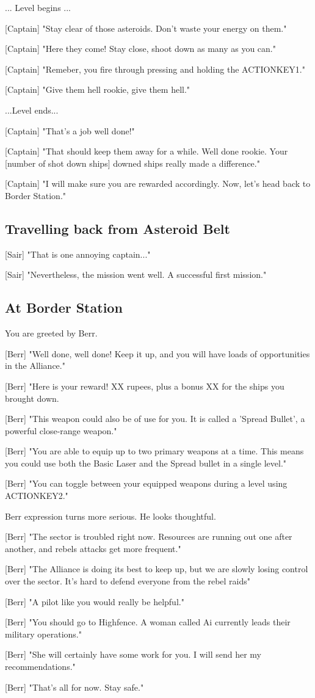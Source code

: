 \documentclass[a4paper,12pt]{article}
\begin{document}
... Level begins ...

[Captain] "Stay clear of those asteroids. Don't waste your energy on them."

[Captain] "Here they come! Stay close, shoot down as many as you can." 

[Captain] "Remeber, you fire through pressing and holding the ACTIONKEY1." 

[Captain] "Give them hell rookie, give them hell."

...Level ends...

[Captain] "That's a job well done!" 

[Captain] "That should keep them away for a while. Well done rookie. Your [number of shot down ships] downed ships really made a difference."

[Captain] "I will make sure you are rewarded accordingly. Now, let's head back to Border Station."

\subsection{Travelling back from Asteroid Belt}

[Sair] "That is one annoying captain..." 

[Sair] "Nevertheless, the mission went well. A successful first mission."

\subsection{At Border Station}

You are greeted by Berr. 

[Berr] "Well done, well done! Keep it up, and you will have loads of opportunities
in the Alliance." 

[Berr] "Here is your reward! XX rupees, plus a bonus XX for the ships you brought down. 

[Berr] "This weapon could also be of use for you. It is called a 'Spread Bullet', a powerful close-range weapon."

[Berr] "You are able to equip up to two primary weapons at a time. This means you could use both the Basic Laser and 
the Spread bullet in a single level."

[Berr] "You can toggle between your equipped weapons during a level using ACTIONKEY2."

Berr expression turns more serious. He looks thoughtful.

[Berr] "The sector is troubled right now. Resources are running out one after another,
and rebels attacks get more frequent."

[Berr] "The Alliance is doing its best to keep up, but we are slowly losing control over the sector. It's hard to defend
everyone from the rebel raids"

[Berr] "A pilot like you would really be helpful."

[Berr] "You should go to Highfence. A woman called Ai currently leads their military operations."

[Berr] "She will certainly have some work for you. I will send her my recommendations."

[Berr] "That's all for now. Stay safe."
\end{document}

